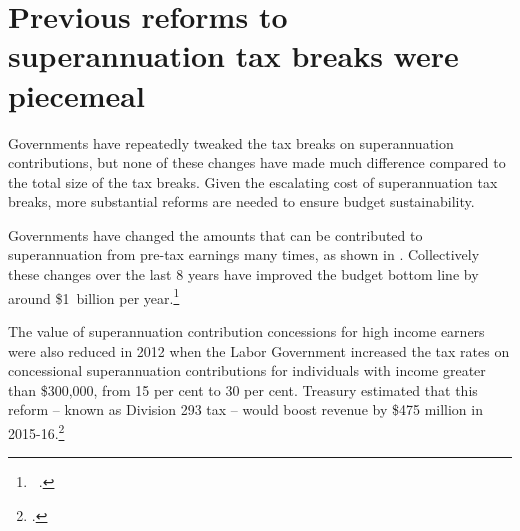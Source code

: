 \documentclass{grattanAlpha}
\begin{document}
\section{Previous reforms to superannuation tax breaks were piecemeal}\label{sec:SUPER-3-8}
Governments have repeatedly tweaked the tax breaks on superannuation contributions, but none of these changes have made much difference compared to the total size of the tax breaks. Given the escalating cost of superannuation tax breaks, more substantial reforms are needed to ensure budget sustainability. 

Governments have changed the amounts that can be contributed to superannuation from pre-tax earnings many times, as shown in . Collectively these changes over the last 8 years have improved the budget bottom line by around \$1~billion per year.\footnote{\gao\ \textcite{TreasurymultipleyearsBudgetPapers200809to201516}.}  

The value of superannuation contribution concessions for high income earners were also reduced in 2012 when the Labor Government increased the tax rates on concessional superannuation contributions for individuals with income greater than \$300,000, from 15 per cent to 30 per cent. Treasury estimated that this reform – known as Division 293 tax – would boost revenue by \$475 million in 2015-16.\footcite[][41]{Treasury2012} 
\end{document}
